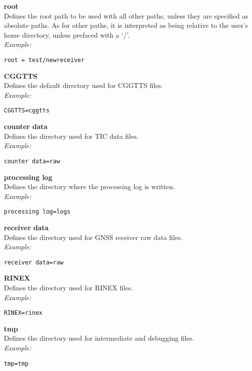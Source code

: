 {\bfseries root}\\
Defines the root path to be used with all other paths, unless they are specified as absolute paths.
As for other paths, it is interpreted as being relative to the user's home directory, unless prefaced with a `/'.\\
\textit{Example:}
\begin{lstlisting}
root = test/newreceiver
\end{lstlisting}

{\bfseries CGGTTS}\\
Defines the default directory used for CGGTTS files.\\
\textit{Example:}
\begin{lstlisting}
CGGTTS=cggtts
\end{lstlisting}

{\bfseries counter data}\\
Defines the directory used for TIC data files.\\
\textit{Example:}
\begin{lstlisting}
counter data=raw
\end{lstlisting}

{\bfseries processing log}\\
Defines the directory where the  processing log is written.\\
\textit{Example:}
\begin{lstlisting}
processing log=logs
\end{lstlisting}

{\bfseries receiver data}\\
Defines the directory used for GNSS receiver raw data files.\\
\textit{Example:}
\begin{lstlisting}
receiver data=raw
\end{lstlisting}

{\bfseries RINEX}\\
Defines the directory used for RINEX files.\\
\textit{Example:}
\begin{lstlisting}
RINEX=rinex
\end{lstlisting}

{\bfseries tmp}\\
Defines the directory used for intermediate and debugging files.\\
\textit{Example:}
\begin{lstlisting}
tmp=tmp
\end{lstlisting}

